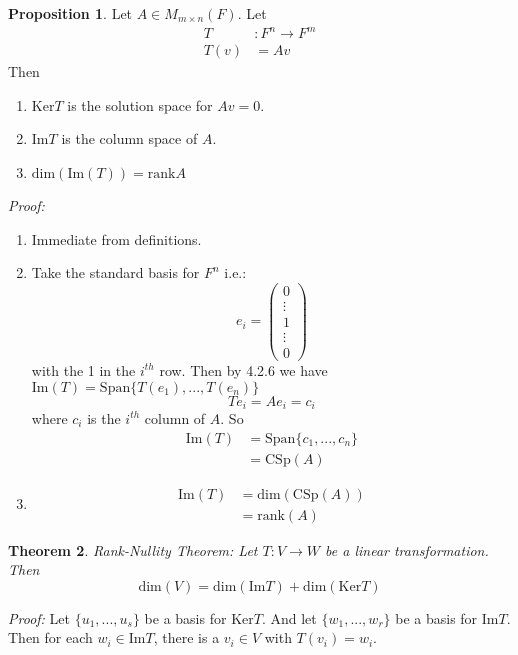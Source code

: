 \documentclass{report}
\newtheorem{theorem}{Theorem}[subsection]
\theoremstyle{remark}
\theoremstyle{definition}
\theoremstyle{definition}
\theoremstyle{theorem}
\newtheorem{proposition}[theorem]{Proposition}
\begin{document}
\begin{proposition}
Let $A \in M_{m \times n}(F)$. Let 
\begin{align*}
    T&:F^n \rightarrow F^m\\
    T(v) &= Av
\end{align*}
Then \begin{enumerate}
    \item $\mathrm{Ker}T$ is the solution space for $Av=0$.
    \item $\mathrm{Im}T$ is the column space of $A$.
    \item $\mathrm{dim}(\mathrm{Im}(T)) = \mathrm{rank}A$
\end{enumerate}
\end{proposition}
\emph{Proof:}
\begin{enumerate}
    \item Immediate from definitions.
    \item Take the standard basis for $F^n$ i.e.:
    \[e_i = \begin{pmatrix}
    0\\\vdots\\1\\\vdots\\0
    \end{pmatrix} \]
    with the 1 in the $i^{th}$ row. Then by 4.2.6 we have $\mathrm{Im}(T) = \mathrm{Span}\{T(e_1),...,T(e_n)\}$
    \[Te_i = Ae_i = c_i\] where $c_i$ is the $i^{th}$ column of $A$. So
    \begin{align*}
        \mathrm{Im}(T) &= \mathrm{Span}\{c_1,...,c_n\}\\
        &=\mathrm{CSp}(A)
    \end{align*}
    \item \begin{align*}
        \mathrm{Im}(T) &= \mathrm{dim}(\mathrm{CSp}(A))\\
        &=\mathrm{rank}(A)
    \end{align*}
\end{enumerate}
\begin{theorem}
\emph{Rank-Nullity Theorem}: Let $T:V\rightarrow W$ be a linear transformation. Then 
\[\mathrm{dim}(V) = \mathrm{dim}(\mathrm{Im}T) + \mathrm{dim}(\mathrm{Ker}T)\]
\end{theorem}
\emph{Proof:} Let $\{u_1,...,u_s\}$ be a basis for $\mathrm{Ker}T$. And let $\{w_1,...,w_r\}$ be a basis for $\mathrm{Im}T$. Then for each $w_i \in \mathrm{Im}T$, there is a $v_i \in V$ with $T(v_i)=w_i$.\par
\end{document}
